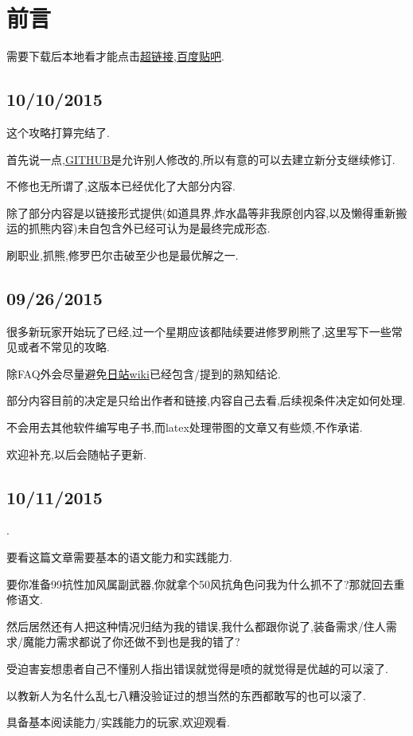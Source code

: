 \newpage

\section{前言}

需要下载后本地看才能点击\href{https://github.com/KindleIsNotKind/Disgaea_5_How_To}{超链接},\href{http://tieba.baidu.com/f?kw=%E9%AD%94%E7%95%8C%E6%88%98%E8%AE%B0&ie=utf-8}{百度贴吧}.

\subsection{10/10/2015}

这个攻略打算完结了.

首先说一点,\href{https://github.com/KindleIsNotKind/Disgaea_5_How_To}{GITHUB}是允许别人修改的,所以有意的可以去建立新分支继续修订.

不修也无所谓了,这版本已经优化了大部分内容.

除了部分内容是以链接形式提供(如道具界,炸水晶等非我原创内容,以及懒得重新搬运的抓熊内容)未自包含外已经可认为是最终完成形态.

刷职业,抓熊,修罗巴尔击破至少也是最优解之一.

\subsection{09/26/2015}

很多新玩家开始玩了已经,过一个星期应该都陆续要进修罗刷熊了,这里写下一些常见或者不常见的攻略.

{\color{red}{本文建立在有魔女DLC和暴君DLC的基础之上,几十块钱和几十小时时间自己选.}}

除FAQ外会尽量避免\href{http://wikinavi.net/disgaea5/index.php}{日站wiki}已经包含/提到的熟知结论.

部分内容目前的决定是只给出作者和链接,内容自己去看,后续视条件决定如何处理.

不会用去其他软件编写电子书,而latex处理带图的文章又有些烦,不作承诺.

欢迎补充,以后会随帖子更新.

\newpage

\subsection{10/11/2015}

{\color{red}{私货,攻击性较强,一般人请翻页}}

{\color{red}{看不惯的可以滚了,这篇文章是分对象的}.

要看这篇文章需要基本的语文能力和实践能力.

要你准备99抗性加风属副武器,你就拿个50风抗角色问我为什么抓不了?那就回去重修语文.

然后居然还有人把这种情况归结为我的错误,我什么都跟你说了,装备需求/住人需求/魔能力需求都说了你还做不到也是我的错了?

受迫害妄想患者自己不懂别人指出错误就觉得是喷的就觉得是优越的可以滚了.

以教新人为名什么乱七八糟没验证过的想当然的东西都敢写的也可以滚了.}

具备基本阅读能力/实践能力的玩家,欢迎观看.


